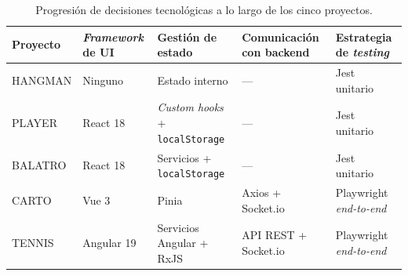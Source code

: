 \begin{table}[H]
\centering
\small
\renewcommand{\arraystretch}{1.3}
\begin{tabularx}{\textwidth}{|>{\raggedright\arraybackslash}p{1.8cm}|>{\raggedright\arraybackslash}p{2.2cm}|>{\raggedright\arraybackslash}p{3cm}|Y|>{\raggedright\arraybackslash}p{2.6cm}|}
\hline
\textbf{Proyecto} & \textbf{\textit{Framework} de UI} & \textbf{Gestión de estado} & \textbf{Comunicación con backend} & \textbf{Estrategia de \textit{testing}} \\
\hline
\ac{HANGMAN} & Ninguno & Estado interno & --- & Jest unitario \\
\hline
\ac{PLAYER} & React 18 & \textit{Custom hooks} + \texttt{localStorage} & --- & Jest unitario \\
\hline
\ac{BALATRO} & React 18 & Servicios + \texttt{localStorage} & --- & Jest unitario \\
\hline
\ac{CARTO} & Vue 3 & Pinia & Axios + Socket.io & Playwright \textit{end-to-end} \\
\hline
\ac{TENNIS} & Angular 19 & Servicios Angular + RxJS & \ac{API} REST + Socket.io & Playwright \textit{end-to-end} \\
\hline
\end{tabularx}
\caption{Progresión de decisiones tecnológicas a lo largo de los cinco proyectos.}
\label{tab:tech-progresion}
\end{table}